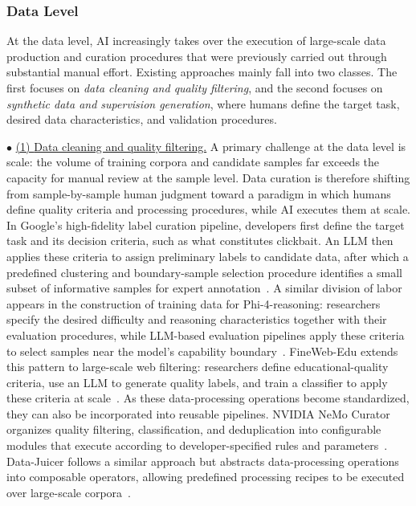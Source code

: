 \subsubsection{Data Level}
At the data level, AI increasingly takes over the execution of large-scale data production and curation procedures that were previously carried out through substantial manual effort. Existing approaches mainly fall into two classes. The first focuses on \emph{data cleaning and quality filtering}, and the second focuses on \emph{synthetic data and supervision generation}, where humans define the target task, desired data characteristics, and validation procedures.

\noindent$\bullet$ \underline{(1) {Data cleaning and quality filtering.}} A primary challenge at the data level is scale: the volume of training corpora and candidate samples far exceeds the capacity for manual review at the sample level. Data curation is therefore shifting from sample-by-sample human judgment toward a paradigm in which humans define quality criteria and processing procedures, while AI executes them at scale. In Google's high-fidelity label curation pipeline, developers first define the target task and its decision criteria, such as what constitutes clickbait. An LLM then applies these criteria to assign preliminary labels to candidate data, after which a predefined clustering and boundary-sample selection procedure identifies a small subset of informative samples for expert annotation~\cite{google_high_fidelity_labels}. A similar division of labor appears in the construction of training data for Phi-4-reasoning: researchers specify the desired difficulty and reasoning characteristics together with their evaluation procedures, while LLM-based evaluation pipelines apply these criteria to select samples near the model's capability boundary~\cite{phi4_reasoning}. FineWeb-Edu extends this pattern to large-scale web filtering: researchers define educational-quality criteria, use an LLM to generate quality labels, and train a classifier to apply these criteria at scale~\cite{penedo2024fineweb}. As these data-processing operations become standardized, they can also be incorporated into reusable pipelines. NVIDIA NeMo Curator organizes quality filtering, classification, and deduplication into configurable modules that execute according to developer-specified rules and parameters~\cite{nemo_curator}. Data-Juicer follows a similar approach but abstracts data-processing operations into composable operators, allowing predefined processing recipes to be executed over large-scale corpora~\cite{data_juicer}.

